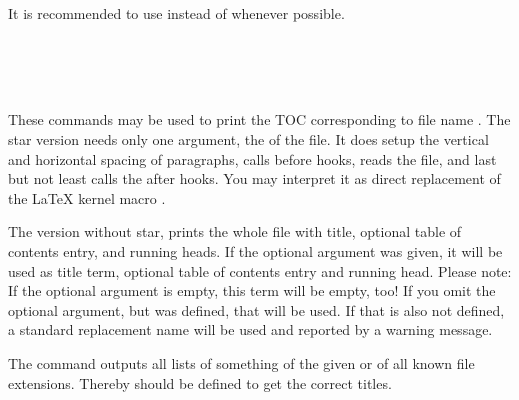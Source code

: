 It is recommended to use  instead
of  whenever possible.
%
%

\begin{Declaration}
  \\
  \\
  \\
\end{Declaration}
%
%
%
%
These commands may be used to print the TOC corresponding to file name
. The star version
 needs only one argument, the  of the
file. It does setup the vertical and horizontal spacing of paragraphs, calls
before hooks, reads the file, and last but not least calls the after hooks.
You may interpret it as direct replacement of the \LaTeX{} kernel macro
.

The version without star, prints the whole file
with title, optional table of contents entry, and running heads. If the
optional argument  was given, it will be used as
title term, optional table of contents entry and running head. Please
note: If the optional argument is empty, this term will
be empty, too! If you omit the optional argument, but
 was defined, that will be used. If that is
also not defined, a standard replacement name will be used and reported by a
warning message.

The command  outputs all
lists of something of the given  or of all known file
extensions. Thereby
 should be defined to get the correct
titles.

